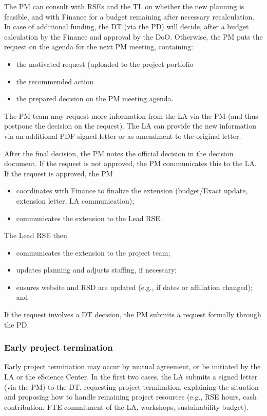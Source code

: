 The PM can consult with RSEs and the TL on whether the new planning is feasible, and with Finance for a budget remaining after necessary recalculation. In case of additional funding, the DT
(via the PD) will decide, after a budget calculation by the Finance and approval by the DoO. Otherwise, the PM puts the
request on the agenda for the next PM meeting, containing: 
\begin{itemize}\itemsep0em
\item the motivated request (uploaded to the project portfolio
\item the recommended action
\item the prepared decision on the PM meeting agenda.
\end{itemize}

The PM team may request more information from the LA via the PM (and thus postpone the decision on the request). The LA
can provide the new information via an additional PDF signed letter or as amendment to the original letter.

After the final decision, the PM notes the official decision in the decision document. If the request is not approved,
the PM communicates this to the LA. If the request is approved, the PM
\begin{itemize}\itemsep0em
\item coordinates with Finance to finalize the extension (budget/Exact update, extension letter, LA communication);
\item communicates the extension to the Lead RSE.
\end{itemize}  
  The Lead RSE then 
\begin{itemize}  
\item communicates the extension to the project team;
\item updates planning and adjusts staffing, if necessary;
\item ensures website and RSD are updated (e.g., if dates or affiliation changed); and
\end{itemize}

If the request involves a DT decision, the PM submits a request formally through the PD.

\subsubsection{Early project termination}
Early project termination may occur by mutual agreement, or be initiated by the LA or the eScience Center. In the first two cases, 
the LA submits a signed letter (via the PM) to the DT, requesting project termination, explaining the situation and proposing how to 
handle remaining project resources (e.g., RSE hours, cash contribution, FTE commitment of the LA, workshops, sustainability budget).

